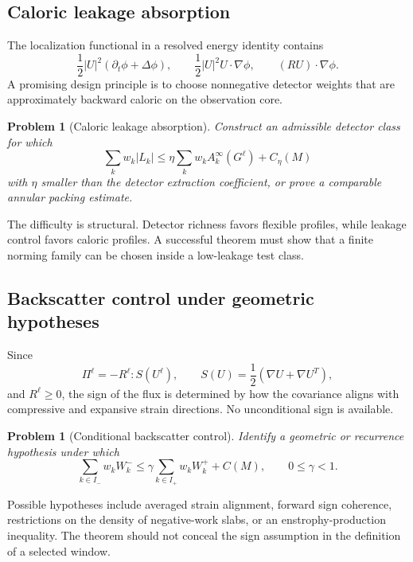 \documentclass[11pt]{article}
\numberwithin{equation}{section}
\newtheorem{problem}[theorem]{Problem}
\theoremstyle{remark}
\begin{document}
\subsection{Caloric leakage absorption}

The localization functional in a resolved energy identity contains
\[
\frac12|U|^2(\partial_t\phi+\Delta\phi),
\qquad
\frac12|U|^2U\cdot\nabla\phi,
\qquad
(RU)\cdot\nabla\phi.
\]
A promising design principle is to choose nonnegative detector weights that are approximately backward caloric on the observation core.

\begin{problem}[Caloric leakage absorption]\label{prob:leakage}
Construct an admissible detector class for which
\begin{equation}\label{eq:leakage-absorption}
\sum_kw_k|L_k|
\le
\eta\sum_kw_k A_k^\infty(G^\ell)
+C_\eta(M)
\end{equation}
with $\eta$ smaller than the detector extraction coefficient, or prove a comparable annular packing estimate.
\end{problem}

The difficulty is structural. Detector richness favors flexible profiles, while leakage control favors caloric profiles. A successful theorem must show that a finite norming family can be chosen inside a low-leakage test class.

\subsection{Backscatter control under geometric hypotheses}

Since
\[
\Pi^\ell=-R^\ell:S(U^\ell),
\qquad
S(U)=\frac12(\nabla U+\nabla U^T),
\]
and $R^\ell\ge0$, the sign of the flux is determined by how the covariance aligns with compressive and expansive strain directions. No unconditional sign is available.

\begin{problem}[Conditional backscatter control]\label{prob:backscatter}
Identify a geometric or recurrence hypothesis under which
\begin{equation}\label{eq:backscatter-target}
\sum_{k\in I_-}w_kW_k^-
\le
\gamma\sum_{k\in I_+}w_kW_k^+
+C(M),
\qquad 0\le\gamma<1.
\end{equation}
\end{problem}

Possible hypotheses include averaged strain alignment, forward sign coherence, restrictions on the density of negative-work slabs, or an enstrophy-production inequality. The theorem should not conceal the sign assumption in the definition of a selected window.
\end{document}
